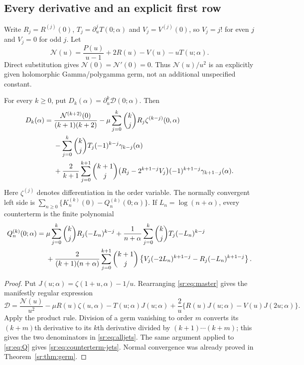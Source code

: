 \subsection{Every derivative and an explicit first row}
Write $R_j=R^{(j)}(0)$, $T_j=\partial_u^jT(0;\alpha)$ and
$V_j=V^{(j)}(0)$, so $V_j=j!$ for even $j$ and $V_j=0$ for odd $j$.
Let
\begin{equation}\label{sr:eq:N-germ}
 \mathcal N(u)=\frac{P(u)}{u-1}+2R(u)-V(u)-uT(u;\alpha).
\end{equation}
Direct substitution gives $\mathcal N(0)=\mathcal N'(0)=0$.
Thus $\mathcal N(u)/u^2$ is an explicitly given holomorphic
Gamma/polygamma germ, not an additional unspecified constant.

\begin{corollary}
\label{sr:cor:alljets}
For every $k\ge0$, put $D_k(\alpha)=\partial_u^k\mathcal D(0;\alpha)$.
Then
\begin{align}
 D_k(\alpha)={}&
 \frac{\mathcal N^{(k+2)}(0)}{(k+1)(k+2)}
 -\mu\sum_{j=0}^k\binom kj R_j\zeta^{(k-j)}(0,\alpha)\notag\\
 &-\sum_{j=0}^k\binom kj T_j(-1)^{k-j}\gamma_{k-j}(\alpha)\notag\\
 &+\frac2{k+1}\sum_{j=0}^{k+1}\binom{k+1}j
 \bigl(R_j-2^{k+1-j}V_j\bigr)(-1)^{k+1-j}
 \gamma_{k+1-j}(\alpha).
 \label{sr:eq:alljets}
\end{align}
Here $\zeta^{(j)}$ denotes differentiation in the order variable.
The normally convergent left side is
$\sum_{n\ge0}\{K_n^{(k)}(0)-Q_n^{(k)}(0;\alpha)\}$. If
$L_n=\log(n+\alpha)$, every counterterm is the finite polynomial
\begin{align}
 Q_n^{(k)}(0;\alpha)={}&\mu\sum_{j=0}^k\binom kjR_j(-L_n)^{k-j}
 +\frac1{n+\alpha}\sum_{j=0}^k\binom kjT_j(-L_n)^{k-j}\notag\\
 &+\frac2{(k+1)(n+\alpha)}
 \sum_{j=0}^{k+1}\binom{k+1}j
 \left\{V_j(-2L_n)^{k+1-j}-R_j(-L_n)^{k+1-j}\right\}.
 \label{sr:eq:counterterm-jets}
\end{align}
\end{corollary}
\begin{proof}
Put $J(u;\alpha)=\zeta(1+u,\alpha)-1/u$. Rearranging
\eqref{sr:eq:master} gives the manifestly regular expression
\[
 \mathcal D=\frac{\mathcal N(u)}{u^2}-\mu R(u)\zeta(u,\alpha)
 -T(u;\alpha)J(u;\alpha)
 +\frac2u\{R(u)J(u;\alpha)-V(u)J(2u;\alpha)\}.
\]
Apply the product rule. Division of a germ vanishing to order $m$
converts its $(k+m)$th derivative to its $k$th derivative divided by
$(k+1)\cdots(k+m)$; this gives the two denominators in
\eqref{sr:eq:alljets}. The same argument applied to \eqref{sr:eq:Q}
gives \eqref{sr:eq:counterterm-jets}. Normal convergence was already
proved in Theorem~\ref{sr:thm:germ}.
\end{proof}

